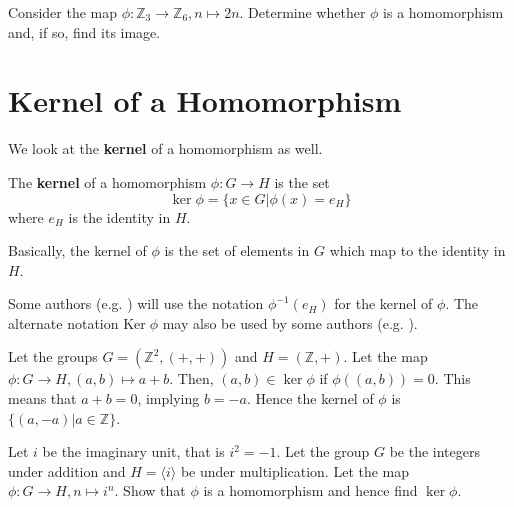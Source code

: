 \begin{exercise}
    Consider the map $\phi: \mathbb{Z}_3 \to \mathbb{Z}_6, n \mapsto 2n$. Determine whether $\phi$ is a homomorphism and, if so, find its image.
\end{exercise}

\section{Kernel of a Homomorphism}
We look at the \textbf{kernel} of a homomorphism as well.

\begin{definition}
    The \textbf{kernel} of a homomorphism $\phi: G \to H$ is the set
    \[
        \ker\phi = \{x \in G \vert \phi(x) = e_H\}
    \]
    where $e_H$ is the identity in $H$.
\end{definition}
Basically, the kernel of $\phi$ is the set of elements in $G$ which map to the identity in $H$.

\begin{remark}
    Some authors (e.g. \cite{libretexts_imandker}) will use the notation $\phi^{-1}(e_H)$ for the kernel of $\phi$. The alternate notation $\mathrm{Ker}\;\phi$ may also be used by some authors (e.g. \cite{clark_1984, hungerford_1980}).
\end{remark}

\begin{example}
    Let the groups $G = (\mathbb{Z}^2, (+, +))$ and $H = (\mathbb{Z}, +)$. Let the map $\phi: G \to H, (a, b) \mapsto a+b$. Then, $(a, b) \in \ker\phi$ if $\phi((a,b)) = 0$. This means that $a+b = 0$, implying $ b = -a$. Hence the kernel of $\phi$ is $\{(a, -a) \vert a \in \mathbb{Z}\}$.
\end{example}

\begin{exercise}
    Let $i$ be the imaginary unit, that is $i^2 = -1$. Let the group $G$ be the integers under addition and $H = \langle i \rangle$ be under multiplication. Let the map $\phi: G \to H, n \mapsto i^n$.  Show that $\phi$ is a homomorphism and hence find $\ker\phi$.
\end{exercise}

